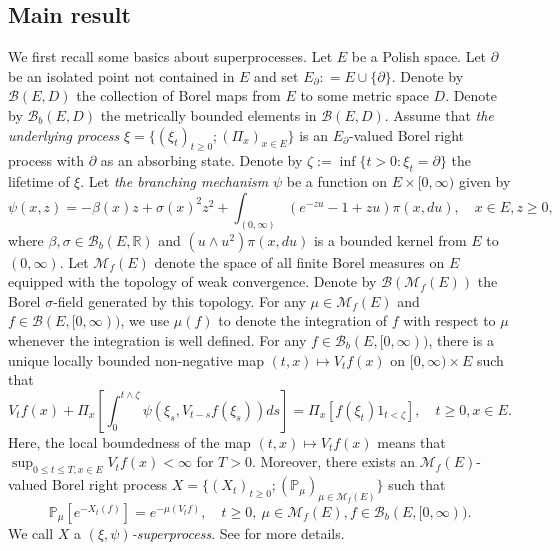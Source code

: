 \documentclass[12pt,a4paper]{amsart}
\numberwithin{equation}{section}
\theoremstyle{plain}
\theoremstyle{definition}
\theoremstyle{remark}
\begin{document}
\subsection{Main result} \label{sec:super}

	We first recall some basics about superprocesses.
	Let $E$ be a Polish space.
    Let $\partial$ be an isolated point not contained in $E$ and set $E_\partial: = E \cup \{\partial\}$.
Denote by $\mathcal B(E, D)$ the collection of Borel maps  from $E$ to some metric space $D$.
    Denote by $\mathcal B_b(E,D)$ the metrically bounded elements in $\mathcal B(E,D)$.
	Assume that \emph{the underlying process} $\xi = \{(\xi_t)_{t\ge0}; (\Pi_x)_{x\in E}\}$ is an $E_\partial$-valued Borel right process with $\partial$ as an absorbing state.
Denote by $\zeta:=\inf\{t>0: \xi_t=\partial\}$ the lifetime of $\xi$.
	Let \emph{the branching mechanism} $\psi$ be a function on $E \times [0,\infty)$ given by
\begin{equation}
	\psi(x,z)
	= -\beta(x) z + \sigma(x)^2 z^2 + \int_{(0,\infty)} (e^{-zu} -1 + zu) \pi(x,du),
	\quad x\in E, z\geq 0,
\end{equation}
	where $\beta, \sigma \in \mathcal B_b(E,\mathbb R)$ and $(u \wedge u^2) \pi(x,du)$ is a bounded kernel from $E$ to $(0,\infty)$.
	Let $\mathcal M_f(E)$ denote the space of all finite Borel measures on $E$ equipped with the topology of weak convergence.
	Denote by $\mathcal B(\mathcal M_f(E))$ the Borel $\sigma$-field generated by this topology.
For any $\mu\in\mathcal M_f(E)$ and $f \in \mathcal B(E, [0,\infty))$, we use $\mu(f)$ to denote the integration of $f$ with respect to $\mu$ whenever the integration is well defined.
	For any $f \in \mathcal B_b(E, [0,\infty))$, there is a unique locally bounded non-negative map $(t,x)\mapsto V_tf(x)$ on $[0,\infty) \times E$ such that
\begin{equation} \label{eq:BGD.1}
	V_tf(x) + \Pi_x \left[ \int_0^{t\wedge \zeta} \psi \left(\xi_s, V_{t-s}f(\xi_s)\right) ds\right]
	= \Pi_x\left[ f(\xi_t)  1_{t < \zeta}\right], \quad t\geq 0, x\in E.
\end{equation}
	 Here, the local boundedness of the map $(t,x) \mapsto V_tf(x)$ means that $\sup_{0\leq t\leq T, x\in E} V_tf(x)< \infty$ for $T >0$.
	Moreover, there exists an $\mathcal M_f(E)$-valued Borel right process $X =\{(X_t)_{t\geq 0}; (\mathbb P_\mu)_{\mu \in \mathcal M_f(E)}\}$ such that
\begin{equation}
	\mathbb P_\mu[e^{- X_t(f)}]
	= e^{- \mu(V_tf)},
	\quad t\geq 0,~\mu \in \mathcal M_f(E), f \in \mathcal B_b(E,[0,\infty)).
\end{equation}
	We call $X$ a \emph{$(\xi, \psi)$-superprocess}.
	See \cite{Li2011MeasureValued} for more details.
\end{document}
